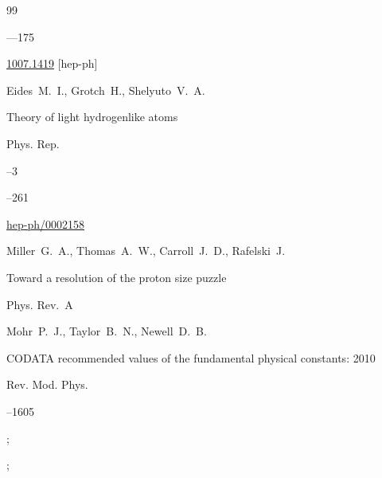 \begin{thebibliography}{99}


---175


\arxiv \href{http://arxiv.org/abs/1007.1419}{1007.1419} [hep-ph]




\by Eides~M.~I., Grotch~H., Shelyuto~V.~A.

\paper Theory of light hydrogenlike atoms

\jour Phys. Rep.



--3

--261


\arxiv \href{http://arxiv.org/abs/hep-ph/0002158}{hep-ph/0002158}




\by Miller~G.~A., Thomas~A.~W., Carroll~J.~D., Rafelski~J.

\paper Toward a resolution of the proton size puzzle

\jour Phys. Rev.~A









\by Mohr~P.~J., Taylor~B.~N., Newell~D.~B.

\paper CODATA recommended values of the fundamental physical constants: 2010

\jour Rev. Mod. Phys.




--1605

;


;






\end{thebibliography}
